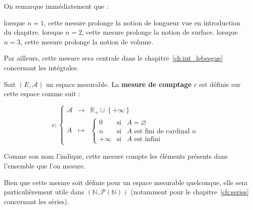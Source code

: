 \documentclass[../integ-proba.tex]{subfiles}
\begin{document}
  \begin{rem}
    On remarque immédiatement que :
    \begin{itemize}
      \itemb lorsque $n=1$, cette mesure prolonge la notion de longueur vue en introduction du chapitre.
      \itemb lorsque $n=2$, cette mesure prolonge la notion de surface.
      \itemb lorsque $n=3$, cette mesure prolonge la notion de volume.
    \end{itemize}

    Par ailleurs, cette mesure sera centrale dans le chapitre~\ref{ch:int_lebesgue} concernant les intégrales.
  \end{rem}

  \begin{exemple}
    \label{ex:ratneg}

  \end{exemple}

  \begin{defi}
    Soit $\left(E,\mathcal{A}\right)$ un espace mesurable.
    La \textbf{mesure de comptage} $c$ est définie sur cette espace comme suit :

    \begin{displaymath}
      c :
    \left\{
    \begin{array}{ccc}
      \mathcal{A} & \longrightarrow & \mathbb{R}_+\cup\left\{+\infty\right\}\\
      A &                                   \longmapsto    &
        \left\{
        \begin{array}{rcl}
          0 & \text{si} & A = \varnothing\\
          n & \text{si} & A \text{ est fini de cardinal } n\\
          +\infty & \text{si} & A \text{ est infini}
        \end{array}
        \right.
    \end{array}
    \right.
    \end{displaymath}
  \end{defi}

  \begin{rem}
    Comme son nom l'indique, cette mesure compte les éléments présents dans l'ensemble que l'on mesure.
  \end{rem}

  \begin{rem}
    Bien que cette mesure soit définie pour un espace mesurable quelconque, elle sera particulièrement utile dans $\left(\mathbb{N},\mathcal{P}\left(\mathbb{N}\right)\right)$ (notamment pour le chapitre~\ref{ch:series} concernant les séries).
  \end{rem}
\end{document}
